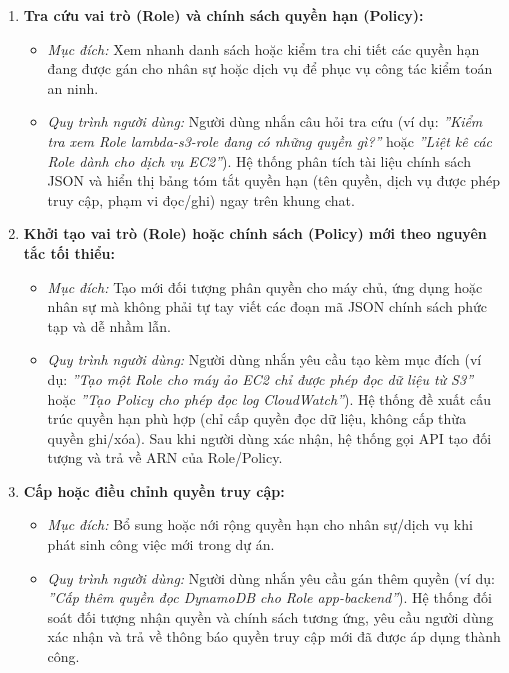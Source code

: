 \documentclass[a4paper,12pt]{article}
\begin{document}
\begin{enumerate}
  \item \textbf{Tra cứu vai trò (Role) và chính sách quyền hạn (Policy):}
  \begin{itemize}
    \item \textit{Mục đích:} Xem nhanh danh sách hoặc kiểm tra chi tiết các quyền hạn đang được gán cho nhân sự hoặc dịch vụ để phục vụ công tác kiểm toán an ninh.
    \item \textit{Quy trình người dùng:} Người dùng nhắn câu hỏi tra cứu (ví dụ: \textit{''Kiểm tra xem Role lambda-s3-role đang có những quyền gì?''} hoặc \textit{''Liệt kê các Role dành cho dịch vụ EC2''}). Hệ thống phân tích tài liệu chính sách JSON và hiển thị bảng tóm tắt quyền hạn (tên quyền, dịch vụ được phép truy cập, phạm vi đọc/ghi) ngay trên khung chat.
  \end{itemize}

  \item \textbf{Khởi tạo vai trò (Role) hoặc chính sách (Policy) mới theo nguyên tắc tối thiểu:}
  \begin{itemize}
    \item \textit{Mục đích:} Tạo mới đối tượng phân quyền cho máy chủ, ứng dụng hoặc nhân sự mà không phải tự tay viết các đoạn mã JSON chính sách phức tạp và dễ nhầm lẫn.
    \item \textit{Quy trình người dùng:} Người dùng nhắn yêu cầu tạo kèm mục đích (ví dụ: \textit{''Tạo một Role cho máy ảo EC2 chỉ được phép đọc dữ liệu từ S3''} hoặc \textit{''Tạo Policy cho phép đọc log CloudWatch''}). Hệ thống đề xuất cấu trúc quyền hạn phù hợp (chỉ cấp quyền đọc dữ liệu, không cấp thừa quyền ghi/xóa). Sau khi người dùng xác nhận, hệ thống gọi API tạo đối tượng và trả về ARN của Role/Policy.
  \end{itemize}

  \item \textbf{Cấp hoặc điều chỉnh quyền truy cập:}
  \begin{itemize}
    \item \textit{Mục đích:} Bổ sung hoặc nới rộng quyền hạn cho nhân sự/dịch vụ khi phát sinh công việc mới trong dự án.
    \item \textit{Quy trình người dùng:} Người dùng nhắn yêu cầu gán thêm quyền (ví dụ: \textit{''Cấp thêm quyền đọc DynamoDB cho Role app-backend''}). Hệ thống đối soát đối tượng nhận quyền và chính sách tương ứng, yêu cầu người dùng xác nhận và trả về thông báo quyền truy cập mới đã được áp dụng thành công.
  \end{itemize}


\end{enumerate}
\end{document}
